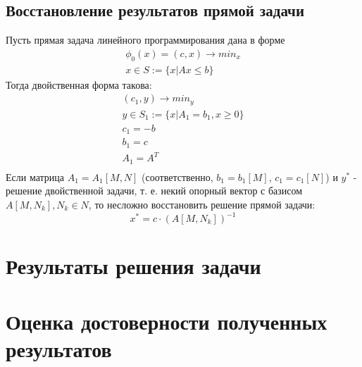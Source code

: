 \documentclass[main.tex]{subfiles}
\begin{document}
\subsection{Восстановление результатов прямой задачи} \label{section:restore}
Пусть прямая задача линейного программирования дана в форме
\begin{gather*}
\phi_0(x) = (c, x) \rightarrow min_{x} \\
x \in S := \{x|Ax \le b\} 
\end{gather*}
Тогда двойственная форма такова:
\begin{gather*}
(c_1, y) \rightarrow min_{y} \\
y \in S_1 := \{x|A_1 = b_1, x \ge 0\}\\
c_1 = -b\\
b_1 = c\\
A_1 = A^T\\
\end{gather*}
Если матрица $A_1=A_1[M,N]$ (соответственно, $b_1 = b_1[M]$, $c_1 = c_1[N]$) и $y^*$ - решение двойственной задачи, т. е. некий опорный вектор с базисом $A[M, N_k], N_k \in N$, то несложно восстановить решение прямой задачи:\\
$$ x^* = c \cdot (A[M, N_k])^{-1}$$
\section{Результаты решения задачи}
\section{Оценка достоверности полученных результатов}
\end{document}
